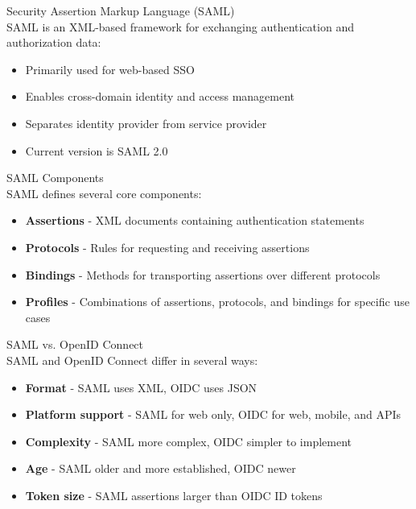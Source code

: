 \begin{definition}{Security Assertion Markup Language (SAML)}\\
SAML is an XML-based framework for exchanging authentication and authorization data:
\begin{itemize}
    \item Primarily used for web-based SSO
    \item Enables cross-domain identity and access management
    \item Separates identity provider from service provider
    \item Current version is SAML 2.0
\end{itemize}
\end{definition}

\begin{concept}{SAML Components}\\
SAML defines several core components:
\begin{itemize}
    \item \textbf{Assertions} - XML documents containing authentication statements
    \item \textbf{Protocols} - Rules for requesting and receiving assertions
    \item \textbf{Bindings} - Methods for transporting assertions over different protocols
    \item \textbf{Profiles} - Combinations of assertions, protocols, and bindings for specific use cases
\end{itemize}
\end{concept}

\begin{concept}{SAML vs. OpenID Connect}\\
SAML and OpenID Connect differ in several ways:
\begin{itemize}
    \item \textbf{Format} - SAML uses XML, OIDC uses JSON
    \item \textbf{Platform support} - SAML for web only, OIDC for web, mobile, and APIs
    \item \textbf{Complexity} - SAML more complex, OIDC simpler to implement
    \item \textbf{Age} - SAML older and more established, OIDC newer
    \item \textbf{Token size} - SAML assertions larger than OIDC ID tokens
\end{itemize}
\end{concept}

